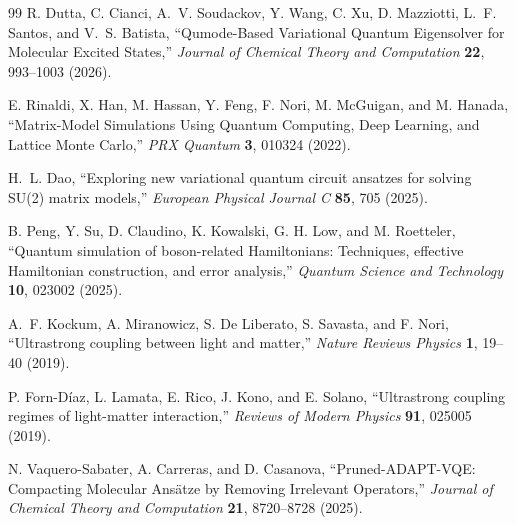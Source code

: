 \documentclass[
  reprint,
  amsmath,
  amssymb,
  aps,
  pra,
  nofootinbib,
  superscriptaddress,
  floatfix
]{revtex4-2}
\begin{document}
\begin{thebibliography}{99}
R. Dutta, C. Cianci, A.~V. Soudackov, Y. Wang, C. Xu, D. Mazziotti, L.~F. Santos, and V.~S. Batista,
``Qumode-Based Variational Quantum Eigensolver for Molecular Excited States,''
\emph{Journal of Chemical Theory and Computation} \textbf{22}, 993--1003 (2026).

E. Rinaldi, X. Han, M. Hassan, Y. Feng, F. Nori, M. McGuigan, and M. Hanada,
``Matrix-Model Simulations Using Quantum Computing, Deep Learning, and Lattice Monte Carlo,''
\emph{PRX Quantum} \textbf{3}, 010324 (2022).

H.~L. Dao,
``Exploring new variational quantum circuit ansatzes for solving SU(2) matrix models,''
\emph{European Physical Journal C} \textbf{85}, 705 (2025).

B. Peng, Y. Su, D. Claudino, K. Kowalski, G. H. Low, and M. Roetteler,
``Quantum simulation of boson-related Hamiltonians: Techniques, effective Hamiltonian construction, and error analysis,''
\emph{Quantum Science and Technology} \textbf{10}, 023002 (2025).

A.~F. Kockum, A. Miranowicz, S. De Liberato, S. Savasta, and F. Nori,
``Ultrastrong coupling between light and matter,''
\emph{Nature Reviews Physics} \textbf{1}, 19--40 (2019).

P. Forn-D{\'i}az, L. Lamata, E. Rico, J. Kono, and E. Solano,
``Ultrastrong coupling regimes of light-matter interaction,''
\emph{Reviews of Modern Physics} \textbf{91}, 025005 (2019).

N. Vaquero-Sabater, A. Carreras, and D. Casanova,
``Pruned-ADAPT-VQE: Compacting Molecular Ans\"atze by Removing Irrelevant Operators,''
\emph{Journal of Chemical Theory and Computation} \textbf{21}, 8720--8728 (2025).

\end{thebibliography}
\end{document}
